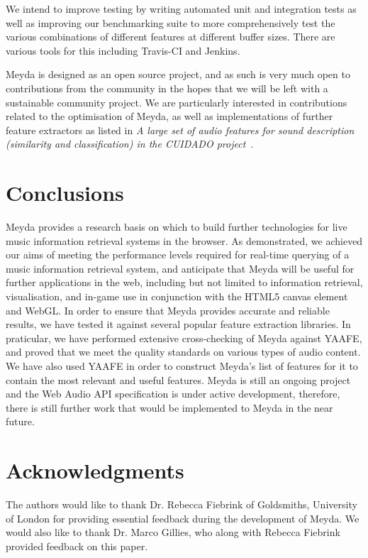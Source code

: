 \documentclass{sig-alternate}
\begin{document}
We intend to improve testing by writing automated unit and integration tests as well as improving our benchmarking suite to more comprehensively test the various combinations of different features at different buffer sizes. There are various tools for this including Travis-CI\cite{travisci} and Jenkins\cite{jenkins}.

Meyda is designed as an open source project, and as such is very much open to contributions from the community in the hopes that we will be left with a sustainable community project. We are particularly interested in contributions related to the optimisation of Meyda, as well as implementations of further feature extractors as listed in \textit{A large set of audio features for sound description (similarity and classification) in the CUIDADO project}~\cite{peeters2004large}.

\section{Conclusions}
Meyda provides a research basis on which to build further technologies for live music information retrieval systems in the browser. As demonstrated, we achieved our aims of meeting the performance levels required for real-time querying of a music information retrieval system, and anticipate that Meyda will be useful for further applications in the web, including but not limited to information retrieval, visualisation, and in-game use in conjunction with the HTML5 canvas element and WebGL. In order to ensure that Meyda provides accurate and reliable results, we have tested it against several popular feature extraction libraries. In praticular, we have performed extensive cross-checking of Meyda against YAAFE, and proved that we meet the quality standards on various types of audio content. We have also used YAAFE in order to construct Meyda's list of features for it to contain the most relevant and useful features. Meyda is still an ongoing project and the Web Audio API specification is under active development, therefore, there is still further work that would be implemented to Meyda in the near future.

\section{Acknowledgments}
The authors would like to thank Dr. Rebecca Fiebrink of Goldsmiths, University of London for providing essential feedback during the development of Meyda. We would also like to thank Dr. Marco Gillies, who along with Rebecca Fiebrink provided feedback on this paper.

\nocite{*}


\end{document}
